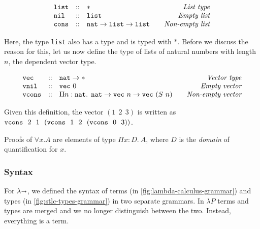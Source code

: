 \[
    \begin{array}{l@{\hspace{1em}}cl@{\hspace{2em}}r}
        \verb|list| & :: & * & \emph{List type} \\
        \verb|nil| & :: & \verb|list| & \emph{Empty list} \\
        \verb|cons| & :: & \verb|nat| \to \verb|list| \to \verb|list| & \emph{Non-empty list}
    \end{array}\vspace{2mm}
\]

Here, the type \verb|list| also has a type and is typed with $*$.
Before we discuss the reason for this, let us now define the type of lists of natural numbers
with length $n$, the dependent vector type.

\[
    \begin{array}{l@{\hspace{1em}}cl@{\hspace{2em}}r}
        \verb|vec| & :: & \verb|nat| \to * & \emph{Vector type} \\
        \verb|vnil| & :: & \verb|vec|\,\, 0 & \emph{Empty vector} \\
        \verb|vcons| & :: & \Pi n : \verb|nat|.\:\: \verb|nat| \to \verb|vec|\,\, n \to \verb|vec|\,\, (S\ n)
        & \emph{Non-empty vector}
    \end{array}\vspace{2mm}
\]

Given this definition, the vector $(1\ \ 2\ \ 3)$ is written as
$\verb|vcons|\ \ 2\ \ 1\ \ (\verb|vcons|\ \ 1\ \ 2\ \ (\verb|vcons|\ \ 0\ \ 3))$.

Proofs of $\forall x. A$ are elements of type $\Pi x:D.\ A$, where $D$ is the \emph{domain} of quantification for $x$.


\subsubsection{Syntax}
For $\lambda\kern -.25em \shortrightarrow$, we defined the syntax of terms (in \cref{fig:lambda-calculus-grammar}) and types (in \cref{fig:stlc-types-grammar}) in two separate grammars.
In $\lambda P$ terms and types are merged and we no longer distinguish between the two.
Instead, everything is a term.

